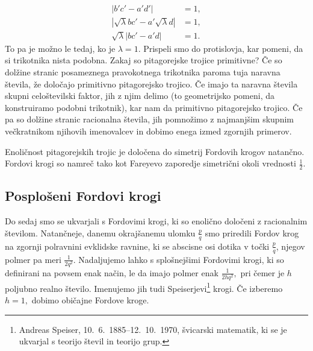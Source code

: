 \documentclass[mat1]{fmfdelo}
\begin{document}
\begin{dokaz}
%
\begin{align}
|b'c'-a'd'| &= 1, \nonumber \\
|\sqrt\lambda bc' - a' \sqrt\lambda d| &= 1, \nonumber \\
\sqrt\lambda |bc'-a'd| &= 1.
\end{align}
%
To pa je možno le tedaj, ko je $\lambda=1.$ Prispeli smo do protislovja, kar pomeni, da si trikotnika nista podobna.
%
Zakaj so pitagorejske trojice primitivne?
Če so dolžine stranic posameznega pravokotnega trikotnika paroma tuja naravna števila, že določajo primitivno pitagorejsko trojico.
Če imajo ta naravna števila skupni celoštevilski faktor, jih z njim delimo (to geometrijsko pomeni, da konstruiramo podobni trikotnik), kar nam da primitivno pitagorejsko trojico.
Če pa so dolžine stranic racionalna števila, jih pomnožimo z najmanjšim skupnim večkratnikom njihovih imenovalcev in dobimo enega izmed zgornjih primerov.
\end{dokaz}

\begin{opomba}
Enoličnost pitagorejskih trojic je določena do simetrij Fordovih krogov natančno. Fordovi krogi so namreč tako kot Fareyevo zaporedje simetrični okoli vrednosti $\frac{1}{2}$.
\end{opomba}

\subsection{Posplošeni Fordovi krogi}

Do sedaj smo se ukvarjali s Fordovimi krogi, ki so enolično določeni z racionalnim številom. Natančneje, danemu okrajšanemu ulomku $\frac{p}{q}$ smo priredili Fordov krog na zgornji polravnini evklidske ravnine, ki se abscisne osi dotika v točki $\frac{p}{q}$, njegov polmer pa meri $\frac{1}{2q^2}.$
Nadaljujemo lahko s splošnejšimi Fordovimi krogi, ki so definirani na povsem enak način, le da imajo polmer enak $\frac{1}{2hq^2},$ pri čemer je $h$ poljubno realno število. Imenujemo jih tudi Speiserjevi\footnote{Andreas Speiser, 10.\ 6.\ 1885--12.\ 10.\ 1970, švicarski matematik, ki se je ukvarjal s teorijo števil in teorijo grup.} krogi. Če izberemo $h=1,$ dobimo običajne Fordove kroge.
\end{document}
